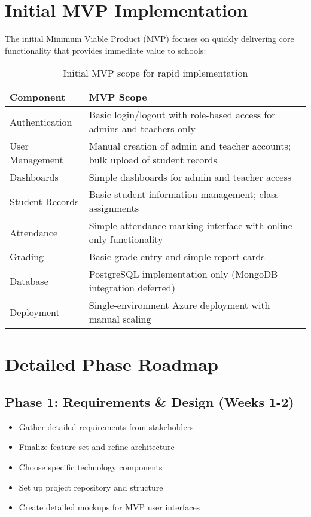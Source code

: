 \documentclass[11pt]{report}
\begin{document}
\section{Initial MVP Implementation}

The initial Minimum Viable Product (MVP) focuses on quickly delivering core functionality that provides immediate value to schools:

\begin{table}[H]
\centering
\begin{tabular}{|p{3.5cm}|p{9cm}|}
\hline
\textbf{Component} & \textbf{MVP Scope} \\
\hline
Authentication & Basic login/logout with role-based access for admins and teachers only \\
\hline
User Management & Manual creation of admin and teacher accounts; bulk upload of student records \\
\hline
Dashboards & Simple dashboards for admin and teacher access \\
\hline
Student Records & Basic student information management; class assignments \\
\hline
Attendance & Simple attendance marking interface with online-only functionality \\
\hline
Grading & Basic grade entry and simple report cards \\
\hline
Database & PostgreSQL implementation only (MongoDB integration deferred) \\
\hline
Deployment & Single-environment Azure deployment with manual scaling \\
\hline
\end{tabular}
\caption{Initial MVP scope for rapid implementation}
\end{table}

\section{Detailed Phase Roadmap}

\subsection{Phase 1: Requirements \& Design (Weeks 1-2)}
\begin{itemize}
    \item Gather detailed requirements from stakeholders
    \item Finalize feature set and refine architecture
    \item Choose specific technology components
    \item Set up project repository and structure
    \item Create detailed mockups for MVP user interfaces
\end{itemize}
\end{document}
